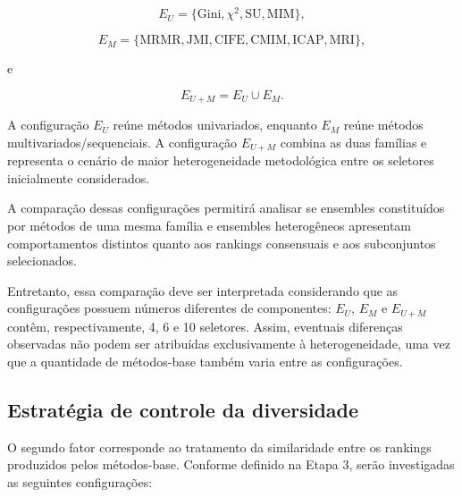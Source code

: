 \begin{equation}
    E_U
    =
    \{
        \mathrm{Gini},
        \chi^2,
        \mathrm{SU},
        \mathrm{MIM}
    \},
\end{equation}

\begin{equation}
    E_M
    =
    \{
        \mathrm{MRMR},
        \mathrm{JMI},
        \mathrm{CIFE},
        \mathrm{CMIM},
        \mathrm{ICAP},
        \mathrm{MRI}
    \},
\end{equation}

e

\begin{equation}
    E_{U+M}
    =
    E_U\cup E_M.
\end{equation}

A configuração $E_U$ reúne métodos univariados, enquanto $E_M$ reúne métodos
multivariados/sequenciais. A configuração $E_{U+M}$ combina as duas famílias
e representa o cenário de maior heterogeneidade metodológica entre os
seletores inicialmente considerados.

A comparação dessas configurações permitirá analisar se ensembles constituídos
por métodos de uma mesma família e ensembles heterogêneos apresentam
comportamentos distintos quanto aos rankings consensuais e aos subconjuntos
selecionados.

Entretanto, essa comparação deve ser interpretada considerando que as
configurações possuem números diferentes de componentes: $E_U$, $E_M$ e
$E_{U+M}$ contêm, respectivamente, 4, 6 e 10 seletores. Assim, eventuais
diferenças observadas não podem ser atribuídas exclusivamente à
heterogeneidade, uma vez que a quantidade de métodos-base também varia entre
as configurações.


\subsection{Estratégia de controle da diversidade}
\label{subsec:ac-efs-config-diversidade}

O segundo fator corresponde ao tratamento da similaridade entre os rankings
produzidos pelos métodos-base. Conforme definido na Etapa 3, serão investigadas
as seguintes configurações:


